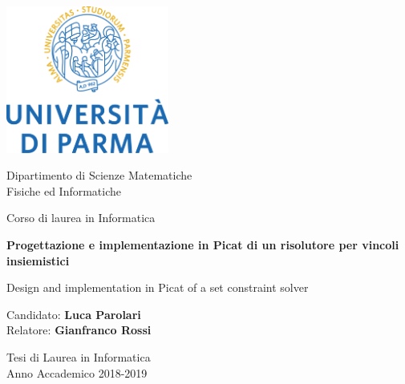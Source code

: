\documentclass[12pt,a4paper,openright]{book} %
\begin{document}
\begin{titlepage}
    \begin{center}       
        \includegraphics[width=0.4\textwidth]{img/logo_unipr.png}

		\vspace{0.5cm}
		
		\Large
        Dipartimento di Scienze Matematiche\\
        Fisiche ed Informatiche

        \vspace{0.5cm}
        
        \Large
        Corso di laurea in Informatica 
		
		\vspace{1.2cm} 
 
        \Huge
        \textbf{Progettazione e implementazione in Picat di un risolutore per vincoli insiemistici}
 
        \vspace{1cm}
        \LARGE
        Design and implementation in Picat of a set constraint solver 
 
        \vspace{1.2cm}
 
		\large Candidato: \Large\textbf{Luca Parolari}\\
		\large Relatore: \Large\textbf{Gianfranco Rossi}
	
		
        \vfill
 		
 		\large
        Tesi di Laurea in Informatica\\
        Anno Accademico 2018-2019
 
    \end{center}
\end{titlepage}
\end{document}
